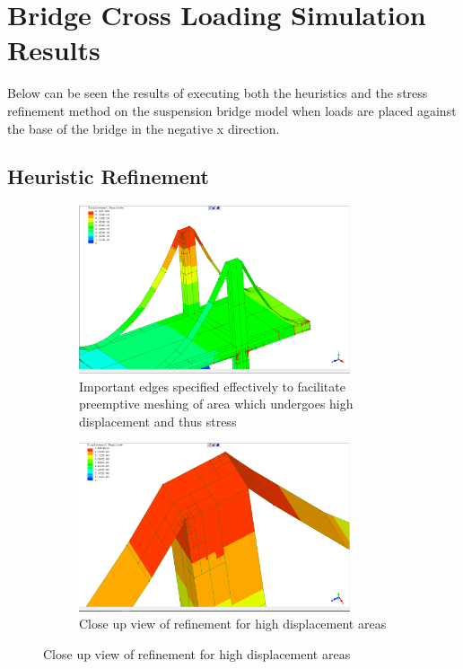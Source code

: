 \section{Bridge Cross Loading Simulation Results}
Below can be seen the results of executing both the heuristics and the stress refinement method on the suspension bridge model when loads are placed against the base of the bridge in the negative x direction.

\subsection{Heuristic Refinement}

\begin{figure}[h!!]
\centering
\begin{subfigure}{.5\textwidth}
  \centering
	\includegraphics[width=80mm, scale=0.5]{../Graphics/BridgeCrossLoading/bestEdgeSpecResults.png}
  \caption{Important edges specified effectively to facilitate preemptive meshing of area which undergoes high displacement and thus stress}
  \label{fig:sub1}
\end{subfigure}%
\begin{subfigure}{.5\textwidth}
  \centering
  \centerline{\includegraphics[width=80mm, scale=0.5]{../Graphics/BridgeCrossLoading/bestEdgeSpecResultsCloseUp.png}}
  \caption{Close up view of refinement for high displacement areas }
  \label{fig:sub2}
\end{subfigure}
\label{fig:test}
\end{figure}


